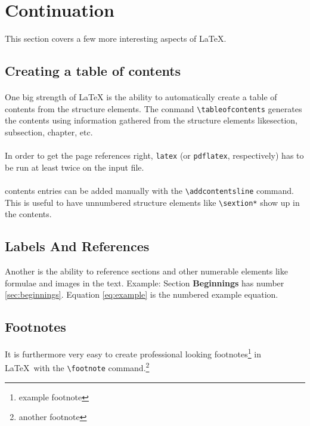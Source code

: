 \documentclass{article}
\begin{document}
\section{Continuation}

This section covers a few more interesting aspects of {\LaTeX}.


\subsection{Creating a table of contents}
\paragraph{}One big strength of {\LaTeX} is the ability to automatically create a table of contents from the
structure elements. The conmand \verb+\tableofcontents+ generates the contents using  information gathered from the structure elements likesection, subsection, chapter, etc.

\paragraph{} In order to get the page references right, \verb+latex+ (or \verb+pdflatex+, respectively) has to be run at least twice on the input file.

\paragraph{} contents entries can be added manually with the \verb+\addcontentsline+ command.
This is useful to have unnumbered structure elements like \verb+\sextion*+ show up in the contents.

\subsection{Labels And References}

Another is the ability to reference  sections and other numerable elements like formulae
and images in the text. Example: Section \textbf{Beginnings} has number \ref{sec:beginnings}.
Equation \ref{eq:example} is the numbered example equation.

\subsection{Footnotes}

It is furthermore very easy to create professional looking  footnotes\footnote{example footnote} in \LaTeX\ with the \verb+\footnote+ command.\footnote{another footnote}
 
\end{document}

